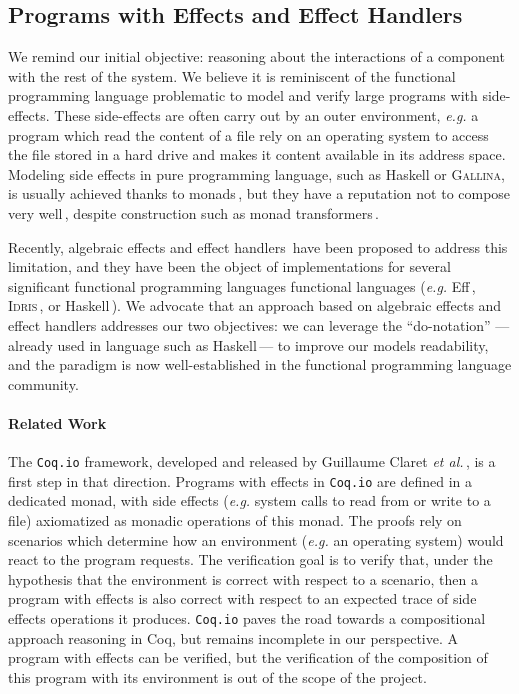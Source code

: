 \subsection{Programs with Effects and Effect Handlers}
\label{subsec:sota:peff}

We remind our initial objective: reasoning about the interactions of a component
with the rest of the system.
%
We believe it is reminiscent of the functional programming language problematic
to model and verify large programs with side-effects.
%
These side-effects are often carry out by an outer environment, \emph{e.g.} a
program which read the content of a file rely on an operating system to access
the file stored in a hard drive and makes it content available in its address
space.
%
Modeling side effects in pure programming language, such as Haskell or {\scshape
  Gallina}, is usually achieved thanks to
monads\,\cite{wadler1990comprehending,jones2005io}, but they have a reputation
not to compose very well\,\cite{hyland2006combining}, despite construction such
as monad transformers\,\cite{liang1995mtl}.

Recently, algebraic effects and effect handlers\,\cite{bauer2015effects} have
been proposed to address this limitation, and they have been the object of
implementations for several significant functional programming languages
functional languages (\emph{e.g.}  Eff\,\cite{bauer2015effects}, {\scshape
  Idris}\,\cite{brady2013idris}, or Haskell\,\cite{kiselyov2013extensible}).
%
We advocate that an approach based on algebraic effects and effect handlers
addresses our two objectives: we can leverage the ``do-notation'' ---already
used in language such as Haskell\,\cite{haskell13}--- to improve our models
readability, and the paradigm is now well-established in the functional
programming language community.

\paragraph{Related Work}
%
The \texttt{Coq.io} framework, developed and released by Guillaume Claret
\emph{et al.}\,\cite{claret2015coqiowww}, is a first step in that direction.
%
Programs with effects in \texttt{Coq.io} are defined in a dedicated monad, with
side effects (\emph{e.g.}  system calls to read from or write to a file)
axiomatized as monadic operations of this monad.
%
The proofs rely on scenarios which determine how an environment (\emph{e.g.} an
operating system) would react to the program requests.
%
The verification goal is to verify that, under the hypothesis that the
environment is correct with respect to a scenario, then a program with effects
is also correct with respect to an expected trace of side effects operations it
produces.
%
\texttt{Coq.io} paves the road towards a compositional approach reasoning in
Coq, but remains incomplete in our perspective.
%
A program with effects can be verified, but the verification of the composition
of this program with its environment is out of the scope of the project.

